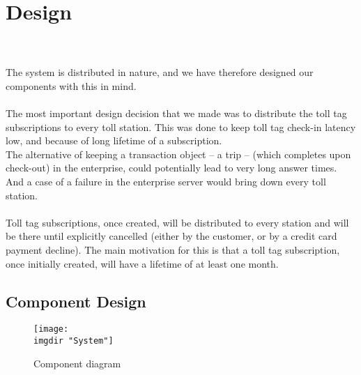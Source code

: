 \chapter{Design}
\anna \piotr \kim \\\\
\noindent
The system is distributed in nature, and we have therefore designed our components with this in mind.\\\\
The most important design decision that we made was to distribute the toll tag subscriptions to every toll station. This was done to keep toll tag check-in latency low, and because of long lifetime of a subscription.\\
The alternative of keeping a transaction object -- a trip -- (which completes upon check-out) in the enterprise, could potentially lead to very long answer times. And a case of a failure in the enterprise server would bring down every toll station.\\\\
Toll tag subscriptions, once created, will be distributed to every station and will be there until explicitly cancelled (either by the customer, or by a credit card payment decline). The main motivation for this is that a toll tag subscription, once initially created, will have a lifetime of at least one month.
\section{Component Design}

\begin{figure}
  \centering
  \texttt{[image: \\imgdir "System"]}
  \caption{Component diagram}
  \label{fig:component_diagram}
\end{figure}

